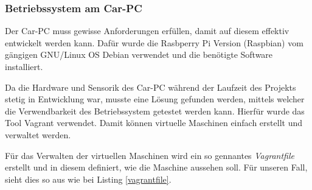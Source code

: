 \subsubsection{Betriebssystem am Car-PC}
\label{subsec:oscarpc}

Der Car-PC muss gewisse Anforderungen erfüllen, damit auf diesem effektiv entwickelt werden kann. Dafür wurde die Rasbperry Pi Version (Raspbian) vom gängigen GNU/Linux OS Debian verwendet und die benötigte Software installiert.

Da die Hardware und Sensorik des Car-PC während der Laufzeit des Projekts stetig in Entwicklung war, musste eine Lösung gefunden werden, mittels welcher die Verwendbarkeit des Betriebssystem getestet werden kann. Hierfür wurde das Tool Vagrant \cite{MELD.CH3-vagrant.website} verwendet. Damit können virtuelle Maschinen einfach erstellt und verwaltet werden. 

Für das Verwalten der virtuellen Maschinen wird ein so gennantes \textit{Vagrantfile} erstellt und in diesem definiert, wie die Maschine aussehen soll. Für unseren Fall, sieht dies so aus wie bei Listing \ref{vagrantfile}.

